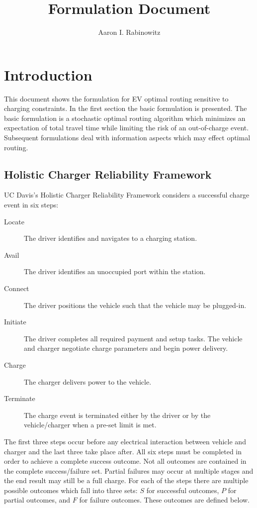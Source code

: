 \documentclass[11pt]{article}
\title{Formulation Document}
\author{Aaron I. Rabinowitz}
\date{}
\begin{document}
\maketitle

\section*{Introduction}

This document shows the formulation for EV optimal routing sensitive to charging constraints. In the first section the basic formulation is presented. The basic formulation is a stochastic optimal routing algorithm which minimizes an expectation of total travel time while limiting the risk of an out-of-charge event. Subsequent formulations deal with information aspects which may effect optimal routing.

\subsection*{Holistic Charger Reliability Framework}

UC Davis's Holistic Charger Reliability Framework considers a successful charge event in six steps:

\begin{description}
	\item[Locate] The driver identifies and navigates to a charging station.
	\item[Avail] The driver identifies an unoccupied port within the station.
	\item[Connect] The driver positions the vehicle such that the vehicle may be plugged-in.
	\item[Initiate] The driver completes all required payment and setup tasks. The vehicle and charger negotiate charge parameters and begin power delivery.
	\item[Charge] The charger delivers power to the vehicle.
	\item[Terminate] The charge event is terminated either by the driver or by the vehicle/charger when a pre-set limit is met.
\end{description}

The first three steps occur before any electrical interaction between vehicle and charger and the last three take place after. All six steps must be completed in order to achieve a complete success outcome. Not all outcomes are contained in the complete success/failure set. Partial failures may occur at multiple stages and the end result may still be a full charge. For each of the steps there are multiple possible outcomes which fall into three sets: $S$ for successful outcomes, $P$ for partial outcomes, and $F$ for failure outcomes. These outcomes are defined below.
\end{document}
